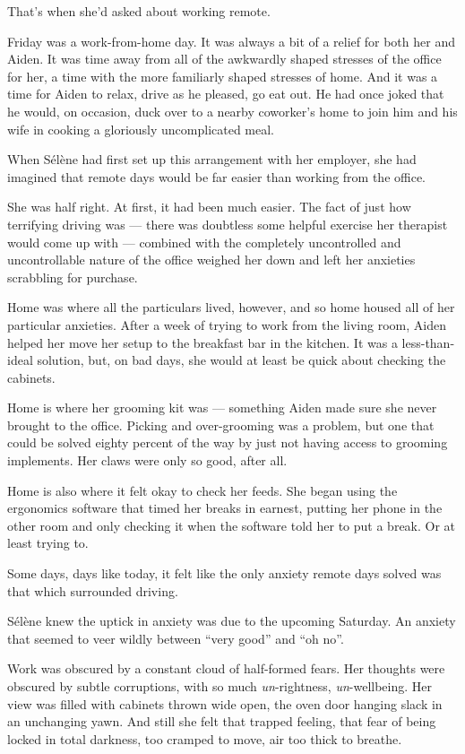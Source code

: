 That's when she'd asked about working remote.

Friday was a work-from-home day. It was always a bit of a relief for both her and Aiden. It was time away from all of the awkwardly shaped stresses of the office for her, a time with the more familiarly shaped stresses of home. And it was a time for Aiden to relax, drive as he pleased, go eat out. He had once joked that he would, on occasion, duck over to a nearby coworker's home to join him and his wife in cooking a gloriously uncomplicated meal.

When Sélène had first set up this arrangement with her employer, she had imagined that remote days would be far easier than working from the office.

She was half right. At first, it had been much easier. The fact of just how terrifying driving was --- there was doubtless some helpful exercise her therapist would come up with --- combined with the completely uncontrolled and uncontrollable nature of the office weighed her down and left her anxieties scrabbling for purchase.

Home was where all the particulars lived, however, and so home housed all of her particular anxieties. After a week of trying to work from the living room, Aiden helped her move her setup to the breakfast bar in the kitchen. It was a less-than-ideal solution, but, on bad days, she would at least be quick about checking the cabinets.

Home is where her grooming kit was --- something Aiden made sure she never brought to the office. Picking and over-grooming was a problem, but one that could be solved eighty percent of the way by just not having access to grooming implements. Her claws were only so good, after all.

Home is also where it felt okay to check her feeds. She began using the ergonomics software that timed her breaks in earnest, putting her phone in the other room and only checking it when the software told her to put a break. Or at least trying to.

Some days, days like today, it felt like the only anxiety remote days solved was that which surrounded driving.

Sélène knew the uptick in anxiety was due to the upcoming Saturday. An anxiety that seemed to veer wildly between ``very good'' and ``oh no''.

Work was obscured by a constant cloud of half-formed fears. Her thoughts were obscured by subtle corruptions, with so much \emph{un}-rightness, \emph{un}-wellbeing. Her view was filled with cabinets thrown wide open, the oven door hanging slack in an unchanging yawn. And still she felt that trapped feeling, that fear of being locked in total darkness, too cramped to move, air too thick to breathe.

